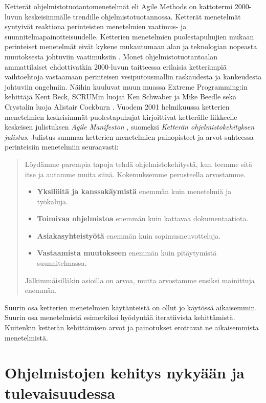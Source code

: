 \documentclass[finnish,12pt]{tktltiki2}
\theoremstyle{definition}
\theoremstyle{remark}
\begin{document}
Ketterät ohjelmistotuotantomenetelmät eli Agile Methods on kattotermi 2000-luvun keskeisimmälle trendille ohjelmistotuotannossa. Ketterät menetelmät syntyivät reaktiona perinteisten menetelmien vaatimus- ja suunnitelmapainotteisuudelle. Ketterien menetelmien puolestapuhujien mukaan perinteiset menetelmät eivät kykene mukautumaan alan ja teknologian nopeasta muutoksesta johtuviin vaatimuksiin \cite{DBLP:journals/ac/CohenLC04}. Monet ohjelmistotuotantoalan ammattilaiset ehdottivatkin 2000-luvun taitteessa erilaisia ketterämpiä vaihtoehtoja vastaamaan perinteisen vesiputousmallin raskaudesta ja kankeudesta johtuviin ongelmiin. Näihin kuuluvat muun muassa Extreme Programming:in kehittäjä Kent Beck, SCRUMin luojat Ken Schwaber ja Mike Beedle sekä Crystalin luoja Alistair Cockburn \cite{Sommerville10,DBLP:journals/ac/CohenLC04}. Vuodem 2001 helmikuussa ketterien menetelmien keskeisimmät puolestapuhujat kirjoittivat ketterälle liikkeelle keskeisen julistuksen \textit{Agile Manifeston} \cite{beck2001agile}, suomeksi \textit{Ketterän ohjelmistokehityksen julistus}. Julistus summaa ketterien menetelmien painopisteet ja arvot suhteessa perinteisiin menetelmiin seuraavasti: 

\begin{quotation}
Löydämme parempia tapoja tehdä ohjelmistokehitystä, kun teemme sitä
itse ja autamme muita siinä. Kokemuksemme perusteella arvostamme.
\begin{itemize}
\item\textbf{Yksilöitä ja kanssakäymistä} enemmän kuin menetelmiä ja työkaluja. 
\item\textbf{Toimivaa ohjelmistoa} enemmän kuin kattavaa dokumentaatiota.
\item\textbf{Asiakasyhteistyötä} enemmän kuin sopimusneuvotteluja.
\item\textbf{Vastaamista muutokseen} enemmän kuin pitäytymistä suunnitelmassa.
\end{itemize}
Jälkimmäisilläkin asioilla on arvoa, mutta
arvostamme ensiksi mainittuja enemmän.\cite{beck2001agile} 
\end{quotation}

Suurin osa ketterien menetelmien käytänteistä on ollut jo käytössä aikaisemmin. Suurin osa menetelmistä esimerkiksi hyödyntää iteratiivista kehittämistä\cite{DBLP:journals/ac/CohenLC04}. Kuitenkin ketterän kehittämisen arvot ja painotukset erottavat ne aikaisemmista menetelmistä.


\section{Ohjelmistojen kehitys nykyään ja tulevaisuudessa}
\end{document}
